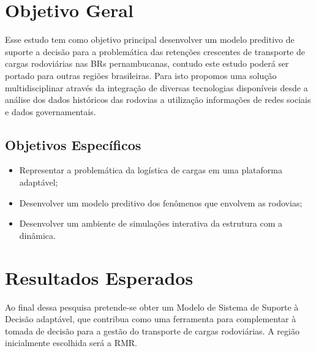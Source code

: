 \section{ Objetivo Geral}\label{intro:objetivo}

Esse estudo tem como objetivo principal desenvolver um modelo preditivo de suporte a decisão para a problemática das retenções crescentes de transporte de cargas rodoviárias 
nas BRs pernambucanas, contudo este estudo poderá ser portado para outras regiões brasileiras. 
Para isto propomos uma solução multidisciplinar através da integração de diversas tecnologias disponíveis desde a análise dos dados históricos das 
rodovias a utilização informações de redes sociais e dados governamentais.

\subsection{ Objetivos Específicos}\label{intro:especificos}

\begin{itemize}
 \item Representar a problemática da logística de cargas em uma plataforma adaptável;
 \item Desenvolver um modelo preditivo dos fenômenos que envolvem as rodovias;
 \item Desenvolver um ambiente de simulações interativa da estrutura com a dinâmica.
\end{itemize}


\section{ Resultados Esperados}\label{resultado}

Ao final dessa pesquisa pretende-se obter um Modelo de Sistema de Suporte à Decisão adaptável, 
que contribua como uma ferramenta para  
complementar à tomada de decisão para a gestão do transporte de cargas rodoviárias. 
A região inicialmente escolhida será a RMR.








